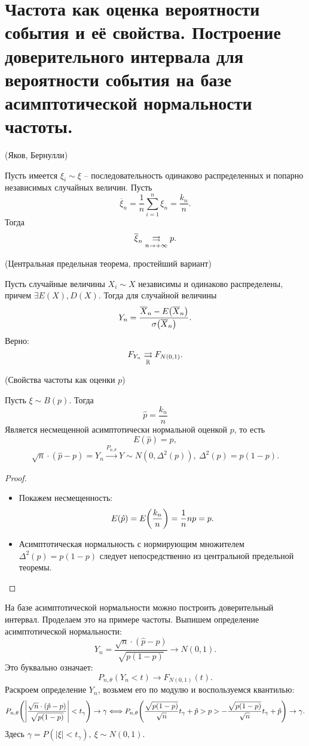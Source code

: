 \section{Частота как оценка вероятности события и её свойства.
    Построение доверительного интервала для вероятности события
на базе асимптотической нормальности частоты.}
\label{sec:normfreq}

\begin{theorem}(Яков, Бернулли)

	Пусть имеется $\xi_i \sim \xi$ -- последовательность одинаково
	распределенных и попарно независимых случайных величин. Пусть
	\[
		\overline{\xi}_n = \frac{1}{n} \sum_{i = 1}^n{\xi_n} = \frac{k_n}{n}
	.\]
	Тогда
	\[
		\overline{\xi}_n \underset{n \to +\infty}{\rightrightarrows} p
	.\]
\end{theorem}

\begin{theorem}(Центральная предельная теорема, простейший вариант)

	Пусть случайные величины $X_i \sim X$ независимы и одинаково распределены,
	причем $\exists E(X), D(X)$. Тогда для случайной величины
	\[
		Y_n = \frac{\overline{X}_n - E\parens*{\overline{X}_n}}
	{\sigma\parens*{\overline{X}_n}}
	.\]
	Верно:
	\[
		F_{Y_n} \underset{\mathbb{R}}{\rightrightarrows} F_{N(0, 1)}
	.\]
\end{theorem}

\begin{theorem}(Свойства частоты как оценки $p$)

	Пусть $\xi \sim B(p)$. Тогда
	\[
		\hat{p} = \frac{k_n}{n}
	\]
	Является несмещенной асимптотически нормальной оценкой $p$, то есть
	\[
		E(\hat{p}) = p,
	\]
	\[
		\sqrt{n} \cdot (\hat{p} - p) = Y_n \xrightarrow[]{P_{n, \theta}} Y
	\sim N(0, \Delta^2(p)),~ \Delta^2(p) = p(1 - p)
	.\]
\end{theorem}
\begin{proof}
	\enewline
	\begin{itemize}
		\item Покажем несмещенность:
			\[
				E(\hat{p}) = E\parens*{\frac{k_n}{n}} = \frac{1}{n} np = p
			.\]
		\item Асимптотическая нормальность с нормирующим множителем
			$\Delta^2(p) = p(1 - p)$ следует непосредственно из
			центральной предельной теоремы.
	\end{itemize}
\end{proof}

На базе асимптотической нормальности можно построить доверительный интервал.
Проделаем это на примере частоты. Выпишем определение асимптотической
нормальности:
\[
	Y_n = \frac{\sqrt{n} \cdot (\hat{p} - p)}{\sqrt{p(1 - p)}} \to N(0, 1)
.\]
Это буквально означает:
\[
	P_{n, \theta}(Y_n < t) \to F_{N(0, 1)}(t)
.\]
Раскроем определение $Y_n$, возьмем его по модулю и воспользуемся квантилью:
\[
	P_{n, \theta}\parens*{\abs*{\frac{\sqrt{n}
    \cdot (\hat{p} - p)}{\sqrt{p(1 - p)}} } < t_\gamma} \to \gamma \Llra
    P_{n, \theta}\parens*{\frac{\sqrt{p(1 - p)}}{\sqrt{n}}t_\gamma + \hat{p}
    > p > -\frac{\sqrt{p(1 - p)}}{\sqrt{n}}t_\gamma + \hat{p}} \to \gamma
.\]
Здесь $\gamma = P(|\xi| < t_\gamma),~ \xi \sim N(0, 1)$.
